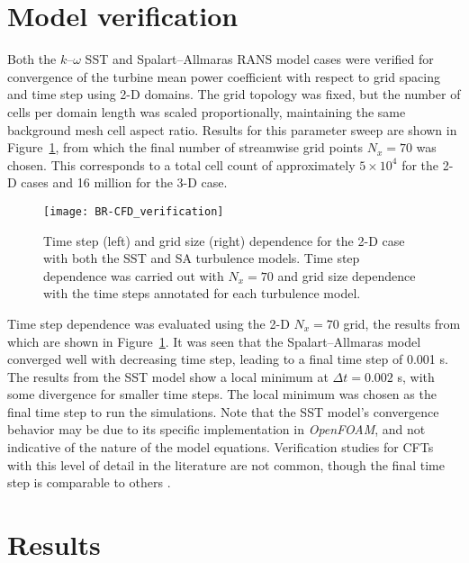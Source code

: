 \section{Model verification}

Both the $k$--$\omega$ SST and Spalart--Allmaras RANS model cases were verified
for convergence of the turbine mean power coefficient with respect to grid
spacing and time step using 2-D domains. The grid topology was fixed, but the
number of cells per domain length was scaled proportionally, maintaining the
same background mesh cell aspect ratio. Results for this parameter sweep are
shown in Figure~\ref{fig:2d-br-verification}, from which the final number of
streamwise grid points $N_x = 70$ was chosen. This corresponds to a total cell
count of approximately $5 \times 10^4$ for the 2-D cases and 16 million for the
3-D case.

\begin{figure}
    \centering

    \texttt{[image: BR-CFD\_verification]}

    \caption{Time step (left) and grid size (right) dependence for the 2-D case
        with both the SST and SA turbulence models. Time step dependence was carried
        out with $N_x=70$ and grid size dependence with the time steps annotated for
        each turbulence model.}

    \label{fig:2d-br-verification}
\end{figure}

Time step dependence was evaluated using the 2-D $N_x=70$ grid, the results from
which are shown in Figure~\ref{fig:2d-br-verification}. It was seen that the
Spalart--Allmaras model converged well with decreasing time step, leading to a
final time step of 0.001 s. The results from the SST model show a local minimum
at $\Delta t = 0.002$ s, with some divergence for smaller time steps. The local
minimum was chosen as the final time step to run the simulations. Note that the
SST model's convergence behavior may be due to its specific implementation in
\textit{OpenFOAM}, and not indicative of the nature of the model equations.
Verification studies for CFTs with this level of detail in the literature are
not common, though the final time step is comparable to others
\cite{Balduzzi2016}.


\section{Results}

